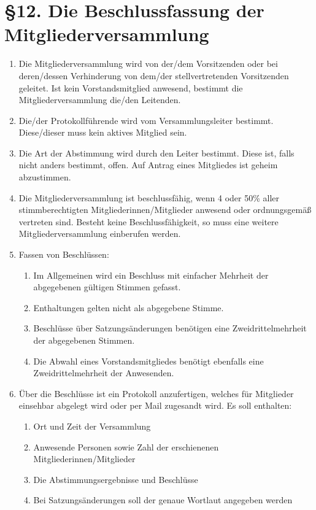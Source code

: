 \documentclass[a4paper,12pt]{article}
\begin{document}
\section*{§12. Die Beschlussfassung der Mitgliederversammlung}

\begin{enumerate}
    	\item
		Die Mitgliederversammlung wird von der/dem Vorsitzenden oder bei
		deren/dessen Verhinderung von dem/der stellvertretenden
		Vorsitzenden geleitet. Ist kein Vorstandsmitglied anwesend,
		bestimmt die Mitgliederversammlung die/den Leitenden.
    	\item
		Die/der Protokollführende wird vom Versammlungsleiter bestimmt.
		Diese/dieser muss kein aktives Mitglied sein.
    	\item
		Die Art der Abstimmung wird durch den Leiter bestimmt. Diese
		ist, falls nicht anders bestimmt, offen. Auf Antrag eines
		Mitgliedes ist geheim abzustimmen.
    	\item
		Die Mitgliederversammlung ist beschlussfähig, wenn 4 oder 50\%
		aller stimmberechtigten Mitgliederinnen/Mitglieder anwesend oder
		ordnungsgemäß vertreten sind. Besteht keine Beschlussfähigkeit,
		so muss eine weitere Mitgliederversammlung einberufen werden.
    	\item
		Fassen von Beschlüssen:
    		\begin{enumerate}[label=(\roman*)]
			\item
				Im Allgemeinen wird ein Beschluss mit einfacher
				Mehrheit der abgegebenen gültigen Stimmen
				gefasst.
			\item
				Enthaltungen gelten nicht als abgegebene Stimme.
			\item
				Beschlüsse über Satzungsänderungen benötigen
				eine Zweidrittelmehrheit der abgegebenen
				Stimmen.
			\item
				Die Abwahl eines Vorstandsmitgliedes benötigt
				ebenfalls eine Zweidrittelmehrheit der
				Anwesenden.
		\end{enumerate}
    	\item
		Über die Beschlüsse ist ein Protokoll anzufertigen, welches für
		Mitglieder einsehbar abgelegt wird oder per Mail zugesandt wird.
		Es soll enthalten:
    		\begin{enumerate}[label=(\roman*)]
        		\item
				Ort und Zeit der Versammlung
        		\item
				Anwesende Personen sowie Zahl der erschienenen
				Mitgliederinnen/Mitglieder
        		\item
				Die Abstimmungsergebnisse und Beschlüsse
        		\item
				Bei Satzungsänderungen soll der genaue Wortlaut
				angegeben werden
    		\end{enumerate}
\end{enumerate}
\end{document}
